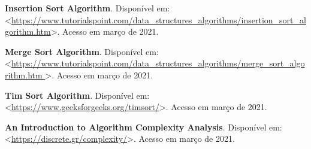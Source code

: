 \documentclass[
	12pt,				%
	openright,			%
	oneside,			%
	a4paper,			%
	english,			%
	french,				%
	spanish,			%
	brazil,				%
	]{ufsj-abntex2}
\begin{document}


% 



\postextual


%

%
%


%

\printindex


\begin{thebibliography}{9}



\textbf{Insertion Sort Algorithm}. Disponível em: <\href{https://www.tutorialspoint.com/data\_structures\_algorithms/insertion\_sort\_algorithm.htm}{https://www.tutorialspoint.com/data\_structures\_algorithms/insertion\_sort\_algorithm.htm}>. Acesso em março de 2021.

\textbf{Merge Sort Algorithm}. Disponível em: <\href{https://www.tutorialspoint.com/data\_structures\_algorithms/merge\_sort\_algorithm.htm
}{https://www.tutorialspoint.com/data\_structures\_algorithms/merge\_sort\_algorithm.htm
}>. Acesso em março de 2021.

\textbf{Tim Sort Algorithm}. Disponível em: <\href{https://www.geeksforgeeks.org/timsort/}{https://www.geeksforgeeks.org/timsort/}>. Acesso em março de 2021.

\textbf{An Introduction to Algorithm Complexity Analysis}. Disponível em: <\href{https://discrete.gr/complexity/}{https://discrete.gr/complexity/}>. Acesso em março de 2021.




\end{thebibliography}
\end{document}
